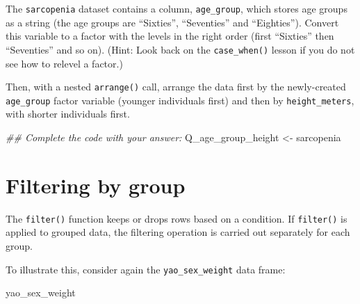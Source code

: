 \documentclass[
  letterpaper,
  DIV=11,
  numbers=noendperiod]{scrreprt}
\newenvironment{Shaded}{\begin{snugshade}}{\end{snugshade}}
\newcommand{\DocumentationTok}[1]{\textcolor[rgb]{0.37,0.37,0.37}{\textit{#1}}}
\newcommand{\NormalTok}[1]{\textcolor[rgb]{0.00,0.23,0.31}{#1}}
\newcommand{\OtherTok}[1]{\textcolor[rgb]{0.00,0.23,0.31}{#1}}
\begin{document}
\begin{tcolorbox}[enhanced jigsaw, title=\textcolor{quarto-callout-tip-color}{\faLightbulb}\hspace{0.5em}{Practice}, colbacktitle=quarto-callout-tip-color!10!white, leftrule=.75mm, arc=.35mm, opacityback=0, bottomrule=.15mm, rightrule=.15mm, toptitle=1mm, breakable, toprule=.15mm, colback=white, coltitle=black, colframe=quarto-callout-tip-color-frame, bottomtitle=1mm, titlerule=0mm, left=2mm, opacitybacktitle=0.6]

The \texttt{sarcopenia} dataset contains a column, \texttt{age\_group},
which stores age groups as a string (the age groups are ``Sixties'',
``Seventies'' and ``Eighties''). Convert this variable to a factor with
the levels in the right order (first ``Sixties'' then ``Seventies'' and
so on). (Hint: Look back on the \texttt{case\_when()} lesson if you do
not see how to relevel a factor.)

Then, with a nested \texttt{arrange()} call, arrange the data first by
the newly-created \texttt{age\_group} factor variable (younger
individuals first) and then by \texttt{height\_meters}, with shorter
individuals first.

\begin{Shaded}
\begin{Highlighting}[]
\DocumentationTok{\#\# Complete the code with your answer:}
\NormalTok{Q\_age\_group\_height }\OtherTok{\textless{}{-}} 
\NormalTok{  sarcopenia }
\end{Highlighting}
\end{Shaded}

\end{tcolorbox}

\section{Filtering by group}\label{filtering-by-group}

The \texttt{filter()} function keeps or drops rows based on a condition.
If \texttt{filter()} is applied to grouped data, the filtering operation
is carried out separately for each group.

To illustrate this, consider again the \texttt{yao\_sex\_weight} data
frame:

\begin{Shaded}
\begin{Highlighting}[]
\NormalTok{yao\_sex\_weight}
\end{Highlighting}
\end{Shaded}
\end{document}
